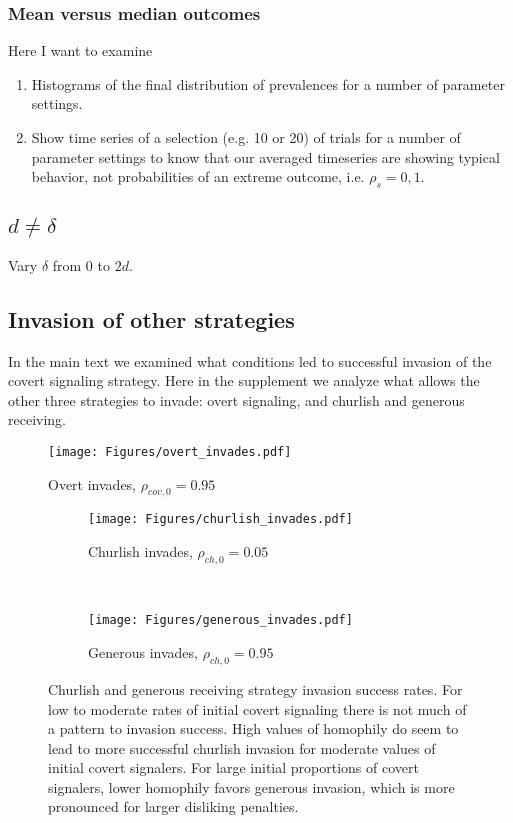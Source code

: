 \documentclass[11pt,letterpaper]{article}
\begin{document}
\subsubsection{Mean versus median outcomes}

Here I want to examine
\begin{enumerate}
  \item Histograms of the final distribution of prevalences for a number of
    parameter settings.
  \item Show time series of a selection (e.g. 10 or 20) of trials for a number
    of parameter settings to know that our averaged timeseries are showing
  typical behavior, not probabilities of an extreme outcome, i.e. $\rho_s=0,1$.

\end{enumerate}

\subsection{$d \neq \delta$}

Vary $\delta$ from 0 to $2d$.



\subsection{Invasion of other strategies}

In the main text we examined what conditions led to successful invasion of
the covert signaling strategy. Here in the supplement we analyze what
allows the other three strategies to invade: overt signaling, and churlish
and generous receiving.

\begin{figure}[H]
  \centering
  \texttt{[image: Figures/overt\_invades.pdf]}
  \caption{Overt invades, $\rho_{cov,0}=0.95$}
  \label{fig:ov-invades}
\end{figure}

\begin{figure}[H]
  \centering
    \begin{subfigure}{\textwidth}
      \texttt{[image: Figures/churlish\_invades.pdf]}
      \caption{Churlish invades, $\rho_{ch,0}=0.05$}
    \end{subfigure} \\
    \begin{subfigure}{\textwidth}
      \texttt{[image: Figures/generous\_invades.pdf]}
      \caption{Generous invades, $\rho_{ch,0}=0.95$}
    \end{subfigure}
  \caption{Churlish and generous receiving strategy invasion success rates.
    For low to moderate rates of initial covert signaling there is not much
    of a pattern to invasion success. High values of homophily do seem to lead
    to more successful churlish invasion for moderate values of initial
    covert signalers. For large initial proportions of covert
    signalers, lower homophily favors generous invasion, which is more pronounced
    for larger disliking penalties.
  }
  \label{fig:ch-gen-invades}
\end{figure}
\end{document}
